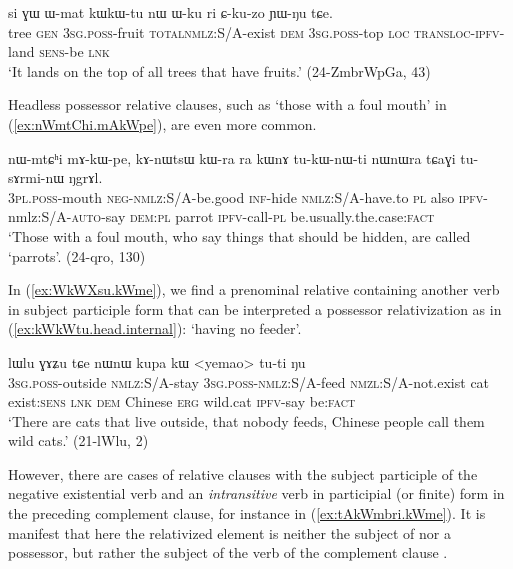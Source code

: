 \begin{exe}
\ex \label{ex:kWkWtu.head.internal}
 \gll si ɣɯ ɯ-mat kɯ\redp{}kɯ-tu nɯ ɯ-ku ri ɕ-ku-zo ɲɯ-ŋu tɕe. \\
 tree \textsc{gen} \textsc{3sg}.\textsc{poss}-fruit \textsc{total}\redp{}\textsc{nmlz}:S/A-exist \textsc{dem} \textsc{3sg}.\textsc{poss}-top \textsc{loc} \textsc{transloc}-\textsc{ipfv}-land \textsc{sens}-be \textsc{lnk} \\
 \glt `It lands on the top of all trees that have fruits.' (24-ZmbrWpGa, 43)
\end{exe}

 Headless possessor relative clauses, such as   `those with a foul mouth' in (\ref{ex:nWmtChi.mAkWpe}), are even more common.

\begin{exe}
\ex \label{ex:nWmtChi.mAkWpe}
 \gll nɯ-mtɕʰi mɤ-kɯ-pe, kɤ-nɯtsɯ kɯ-ra ra kɯnɤ tu-kɯ-nɯ-ti nɯnɯra tɕaɣi tu-sɤrmi-nɯ ŋgrɤl. \\
 \textsc{3pl}.\textsc{poss}-mouth \textsc{neg}-\textsc{nmlz}:S/A-be.good \textsc{inf}-hide \textsc{nmlz}:S/A-have.to \textsc{pl} also \textsc{ipfv}-nmlz:S/A-\textsc{auto}-say \textsc{dem}:\textsc{pl} parrot \textsc{ipfv}-call-\textsc{pl} be.usually.the.case:\textsc{fact} \\
 \glt `Those with a foul mouth, who say things that should be hidden, are called `parrots'. (24-qro, 130)
\end{exe}

In (\ref{ex:WkWXsu.kWme}), we find a prenominal relative containing another verb in subject participle form that can be interpreted a possessor relativization as in (\ref{ex:kWkWtu.head.internal}):   `having no feeder'.

\begin{exe}
\ex \label{ex:WkWXsu.kWme}
  lɯlu ɣɤʑu tɕe nɯnɯ kupa kɯ <yemao> tu-ti ŋu \\
 \textsc{3sg}.\textsc{poss}-outside \textsc{nmlz}:S/A-stay \textsc{3sg}.\textsc{poss}-\textsc{nmlz}:S/A-feed \textsc{nmzl}:S/A-not.exist cat exist:\textsc{sens} \textsc{lnk} \textsc{dem} Chinese \textsc{erg} wild.cat \textsc{ipfv}-say be:\textsc{fact} \\
 \glt `There are cats that live outside, that nobody feeds, Chinese people call them wild cats.' (21-lWlu, 2)
 \end{exe}

However, there are cases of relative clauses with the subject participle of the negative existential verb  and an \textit{intransitive} verb in participial (or finite) form in the preceding complement clause, for instance  in (\ref{ex:tAkWmbri.kWme}). It is manifest that here the relativized element is neither the subject of  nor a possessor, but rather the subject of the verb of the complement clause .

